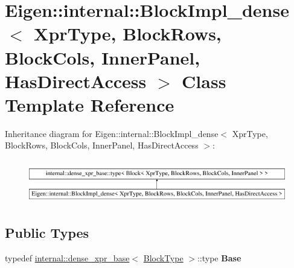 \hypertarget{class_eigen_1_1internal_1_1_block_impl__dense}{}\section{Eigen\+::internal\+::Block\+Impl\+\_\+dense$<$ Xpr\+Type, Block\+Rows, Block\+Cols, Inner\+Panel, Has\+Direct\+Access $>$ Class Template Reference}
\label{class_eigen_1_1internal_1_1_block_impl__dense}
Inheritance diagram for Eigen\+::internal\+::Block\+Impl\+\_\+dense$<$ Xpr\+Type, Block\+Rows, Block\+Cols, Inner\+Panel, Has\+Direct\+Access $>$\+:\begin{figure}[H]
\begin{center}
\leavevmode
\includegraphics[height=1.914530cm]{class_eigen_1_1internal_1_1_block_impl__dense}
\end{center}
\end{figure}
\subsection*{Public Types}
\begin{DoxyCompactItemize}
\item 
\mbox{\label{class_eigen_1_1internal_1_1_block_impl__dense_a82e7e22b0f7dfac2a9d51c83e6466f72}} 
typedef \mbox{\hyperlink{struct_eigen_1_1internal_1_1dense__xpr__base}{internal\+::dense\+\_\+xpr\+\_\+base}}$<$ \mbox{\hyperlink{class_eigen_1_1_block}{Block\+Type}} $>$\+::type {\bfseries Base}
\end{DoxyCompactItemize}
